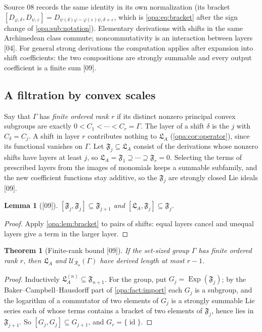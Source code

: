\documentclass[11pt,oneside]{article}
\numberwithin{equation}{section}
\newtheorem{theorem}{Theorem}[section]
\newtheorem{lemma}[lemma]{Lemma}
\theoremstyle{definition}
\theoremstyle{remark}
\newcommand{\oo}{\mathfrak o}
\newcommand{\Ro}{\mathcal R_{\oo}}
\newcommand{\LL}{\mathfrak L}
\newcommand{\UU}{\mathcal U}
\newcommand{\FF}{\mathfrak F}
\newcommand{\id}{\operatorname{id}}
\newcommand{\Exp}{\operatorname{Exp}}
\newcommand{\src}[1]{\textup{\textsf{\small[#1]}}}
\begin{document}
Source 08 records the same identity in its own normalization (its bracket
$[D_{\varphi,\delta},D_{\psi,\varepsilon}]=D_{\psi(\delta)\varphi-\varphi(\varepsilon)\psi,
\delta+\varepsilon}$, which is \eqref{opa:eq:bracket} after the sign change of
\cref{opa:sub:notation}). Elementary derivations with shifts in the same
Archimedean class commute; noncommutativity is an interaction between layers
\src{04}. For general strong derivations the computation applies after
expansion into shift coefficients: the two compositions are strongly summable
and every output coefficient is a finite sum \src{09}.

\subsection{A filtration by convex scales}

Say that $\Gamma$ has \emph{finite ordered rank $r$} if its distinct nonzero
principal convex subgroups are exactly $0<C_1<\cdots<C_r=\Gamma$. The layer of a
shift $\delta$ is the $j$ with $C_\delta=C_j$. A shift in layer $r$ contributes
nothing to $\LL_A$ (\cref{opa:cor:operator}), since its functional vanishes on
$\Gamma$. Let $\FF_j\subseteq\LL_A$ consist of the derivations whose nonzero
shifts have layers at least $j$, so $\LL_A=\FF_1\supseteq\cdots\supseteq\FF_r=0$.
Selecting the terms of prescribed layers from the images of monomials keeps a
summable subfamily, and the new coefficient functions stay additive, so the
$\FF_j$ are strongly closed Lie ideals \src{09}.

\begin{lemma}[\src{09}]\label{opa:lem:rankfiltration}
$[\FF_j,\FF_j]\subseteq\FF_{j+1}$ and $[\LL_A,\FF_j]\subseteq\FF_j$.
\end{lemma}
\begin{proof}
Apply \cref{opa:lem:bracket} to pairs of shifts: equal layers cancel and unequal
layers give a term in the larger layer.
\end{proof}

\begin{theorem}[Finite-rank bound \src{09}]\label{opa:thm:derivedrank}
If the set-sized group $\Gamma$ has finite ordered rank $r$, then $\LL_A$ and
$\UU_{\Ro}(\Gamma)$ have derived length at most $r-1$.
\end{theorem}
\begin{proof}
Inductively $\LL_A^{(n)}\subseteq\FF_{n+1}$. For the group, put
$G_j=\Exp(\FF_j)$; by the Baker--Campbell--Hausdorff part of
\cref{opa:fact:import} each $G_j$ is a subgroup, and the logarithm of a
commutator of two elements of $G_j$ is a strongly summable Lie series each of
whose terms contains a bracket of two elements of $\FF_j$, hence lies in
$\FF_{j+1}$. So $[G_j,G_j]\subseteq G_{j+1}$, and $G_r=\{\id\}$.
\end{proof}
\end{document}
